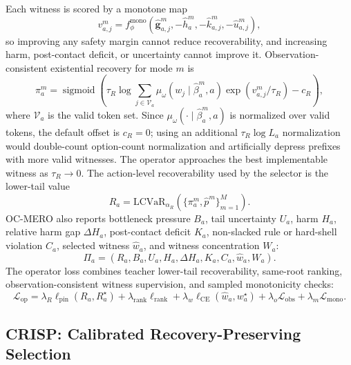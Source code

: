 \documentclass[conference]{IEEEtran}
\DeclareMathOperator{\sigmoid}{sigmoid}
\begin{document}
Each witness is scored by a monotone map
\begin{equation}
\label{eq:method_option_score_new}
    v_{a,j}^{m}=f_{\phi}^{\mathrm{mono}}(
    \widehat{\bm g}_{a,j}^{m},
    -\widehat h_a^m,
    -\widehat k_{a,j}^m,
    -\widehat u_{a,j}^m),
\end{equation}
so improving any safety margin cannot reduce recoverability, and increasing harm, post-contact deficit, or uncertainty cannot improve it.  Observation-consistent existential recovery for mode $m$ is
\begin{equation}
\label{eq:method_existential_new}
    \pi_a^m=\sigmoid\!\left(
    \tau_R\log\sum_{j\in\mathcal V_a}
    \mu_\omega(w_j\mid\widehat\beta_a^m,a)
    \exp(v_{a,j}^{m}/\tau_R)-c_R
    \right),
\end{equation}
where $\mathcal V_a$ is the valid token set.  Since $\mu_\omega(\cdot\mid\widehat\beta_a^m,a)$ is normalized over valid tokens, the default offset is $c_R=0$; using an additional $\tau_R\log L_a$ normalization would double-count option-count normalization and artificially depress prefixes with more valid witnesses.  The operator approaches the best implementable witness as $\tau_R\to0$.  The action-level recoverability used by the selector is the lower-tail value
\begin{equation}
\label{eq:method_tail_recovery_new}
    R_a=\mathrm{LCVaR}_{\alpha_R}(\{\pi_a^m,\hat p^m\}_{m=1}^{M}).
\end{equation}
OC-MERO also reports bottleneck pressure $B_a$, tail uncertainty $U_a$, harm $H_a$, relative harm gap $\Delta H_a$, post-contact deficit $K_a$, non-slacked rule or hard-shell violation $C_a$, selected witness $\hat w_a$, and witness concentration $W_a$:
\begin{equation}
\label{eq:method_profile_new}
    \Pi_a=(R_a,B_a,U_a,H_a,\Delta H_a,K_a,C_a,\hat w_a,W_a).
\end{equation}
The operator loss combines teacher lower-tail recoverability, same-root ranking, observation-consistent witness supervision, and sampled monotonicity checks:
\begin{equation}
\label{eq:method_operator_loss}
    \mathcal L_{\mathrm{op}}=
    \lambda_R\ell_{\mathrm{pin}}(R_a,R_a^\star)
    +\lambda_{\mathrm{rank}}\ell_{\mathrm{rank}}
    +\lambda_w\ell_{\mathrm{CE}}(\hat w_a,w_a^\star)
    +\lambda_o\mathcal L_{\mathrm{obs}}
    +\lambda_m\mathcal L_{\mathrm{mono}}.
\end{equation}

\subsection{CRISP: Calibrated Recovery-Preserving Selection}
\label{subsec:crisp_new}
\end{document}
